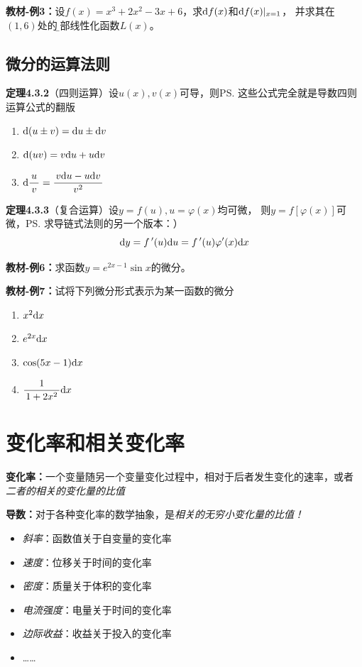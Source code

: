 {\bf 教材-例3：}设$f(x)=x^3+2x^2-3x+6$，求$\mathrm{d} f(x)$和$\mathrm{d} f(x)|_{x=1}$，
并求其在$(1,6)$处的{\b 局部线性化函数$L(x)$}。

\subsection{微分的运算法则}

{\bf 定理4.3.2}（四则运算）设$u(x),v(x)$可导，则\ps{这些公式完全就是导数四则运算公式的翻版}
\begin{enumerate}[(1)]
  \setlength{\itemindent}{1cm}
  \item $\mathrm{d} (u\pm v)=\mathrm{d} u\pm \mathrm{d} v$
  \item $\mathrm{d}(uv)=v\mathrm{d} u+u\mathrm{d} v$
  \item $\mathrm{d}\displaystyle\frac{\,{u}\,}{\,{v}\,}=\displaystyle\frac{\,{v\mathrm{d} u-u\mathrm{d} v}\,}{\,{v^2}\,}$
\end{enumerate}

{\bf 定理4.3.3}（复合运算）设$y=f(u),u=\varphi(x)$均可微，
则$y=f[\varphi(x)]$可微，\ps{求导链式法则的另一个版本：）}
$$\mathrm{d} y=f\,'(u)\mathrm{d} u=f\,'(u)\varphi'(x)\mathrm{d} x$$

{\bf 教材-例6：}求函数$y=e^{2x-1}\sin x$的微分。

{\bf 教材-例7：}试将下列微分形式表示为某一函数的微分 
\begin{enumerate}[(1)]
  \setlength{\itemindent}{1cm}
  \item $x^2\mathrm{d} x$ 
  \item $e^{2x}\mathrm{d} x$ 
  \item $\cos(5x-1)\mathrm{d} x$ 
  \item $\displaystyle\frac{\,{1}\,}{\,{1+2x^2}\,}\mathrm{d} x$
\end{enumerate}

\section{变化率和相关变化率}

{\bf 变化率：}一个变量随另一个变量变化过程中，相对于后者发生变化的速率，或者
{\it 二者的相关的变化量的比值}

{\bf 导数：}对于各种变化率的数学抽象，是{\it 相关的无穷小变化量的比值！}

\begin{itemize}
  \setlength{\itemindent}{1cm}
  \item {\it 斜率}：函数值关于自变量的变化率 
  \item {\it 速度}：位移关于时间的变化率 
  \item {\it 密度}：质量关于体积的变化率 
  \item {\it 电流强度}：电量关于时间的变化率 
  \item {\it 边际收益}：收益关于投入的变化率 
  \item {\ldots\ldots} 
\end{itemize}

